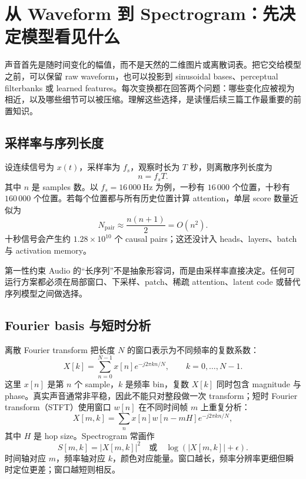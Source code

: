 \section{从 Waveform 到 Spectrogram：先决定模型看见什么}

声音首先是随时间变化的幅值，而不是天然的二维图片或离散词表。把它交给模型之前，可以保留 raw waveform，也可以投影到 sinusoidal bases、perceptual filterbanks 或 learned features。每次变换都在回答两个问题：哪些变化应被视为相近，以及哪些细节可以被压缩。理解这些选择，是读懂后续三篇工作最重要的前置知识。

\subsection{采样率与序列长度}

设连续信号为 $x(t)$，采样率为 $f_s$，观察时长为 $T$ 秒，则离散序列长度为
\[
n=f_sT.
\]
其中 $n$ 是 samples 数。以 $f_s=16\,000\ \mathrm{Hz}$ 为例，一秒有 $16\,000$ 个位置，十秒有 $160\,000$ 个位置。若每个位置都与所有历史位置计算 attention，单层 score 数量近似为
\[
N_{\mathrm{pair}}\approx \frac{n(n+1)}{2}=O(n^2).
\]
十秒信号会产生约 $1.28\times10^{10}$ 个 causal pairs；这还没计入 heads、layers、batch 与 activation memory。

\begin{importantbox}{第一性约束}
Audio 的“长序列”不是抽象形容词，而是由采样率直接决定。任何可运行方案都必须在局部窗口、下采样、patch、稀疏 attention、latent code 或替代序列模型之间做选择。
\end{importantbox}

\subsection{Fourier basis 与短时分析}

离散 Fourier transform 把长度 $N$ 的窗口表示为不同频率的复数系数：
\[
X[k]=\sum_{n=0}^{N-1}x[n]e^{-j2\pi kn/N},
\qquad k=0,\ldots,N-1.
\]
这里 $x[n]$ 是第 $n$ 个 sample，$k$ 是频率 bin，复数 $X[k]$ 同时包含 magnitude 与 phase。真实声音通常非平稳，因此不能只对整段做一次 transform；短时 Fourier transform（STFT）使用窗口 $w[n]$ 在不同时间帧 $m$ 上重复分析：
\[
X[m,k]=\sum_n x[n]w[n-mH]e^{-j2\pi kn/N},
\]
其中 $H$ 是 hop size。Spectrogram 常画作
\[
S[m,k]=|X[m,k]|^2
\quad\text{或}\quad \log(|X[m,k]|+\epsilon).
\]
时间轴对应 $m$，频率轴对应 $k$，颜色对应能量。窗口越长，频率分辨率更细但瞬时定位更差；窗口越短则相反。


